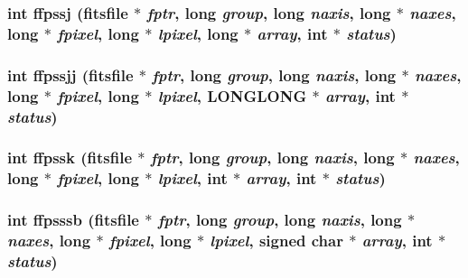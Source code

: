 \subsubsection{\setlength{\rightskip}{0pt plus 5cm}int ffpssj (\bf{fitsfile} $\ast$ {\em fptr}, long {\em group}, long {\em naxis}, long $\ast$ {\em naxes}, long $\ast$ {\em fpixel}, long $\ast$ {\em lpixel}, long $\ast$ {\em array}, int $\ast$ {\em status})}\label{test_2shm__client_2fitsio_8h_ed68d2a2c51c19b9579ca7db53e148c5}


\subsubsection{\setlength{\rightskip}{0pt plus 5cm}int ffpssjj (\bf{fitsfile} $\ast$ {\em fptr}, long {\em group}, long {\em naxis}, long $\ast$ {\em naxes}, long $\ast$ {\em fpixel}, long $\ast$ {\em lpixel}, \bf{LONGLONG} $\ast$ {\em array}, int $\ast$ {\em status})}\label{test_2shm__client_2fitsio_8h_f77af8b17c852fc01b279669bc4d1331}


\subsubsection{\setlength{\rightskip}{0pt plus 5cm}int ffpssk (\bf{fitsfile} $\ast$ {\em fptr}, long {\em group}, long {\em naxis}, long $\ast$ {\em naxes}, long $\ast$ {\em fpixel}, long $\ast$ {\em lpixel}, int $\ast$ {\em array}, int $\ast$ {\em status})}\label{test_2shm__client_2fitsio_8h_07580d14729935ae3509602b651e7449}


\subsubsection{\setlength{\rightskip}{0pt plus 5cm}int ffpsssb (\bf{fitsfile} $\ast$ {\em fptr}, long {\em group}, long {\em naxis}, long $\ast$ {\em naxes}, long $\ast$ {\em fpixel}, long $\ast$ {\em lpixel}, signed char $\ast$ {\em array}, int $\ast$ {\em status})}\label{test_2shm__client_2fitsio_8h_169a2bd7cc6b4306fac13a357df4dcf0}


